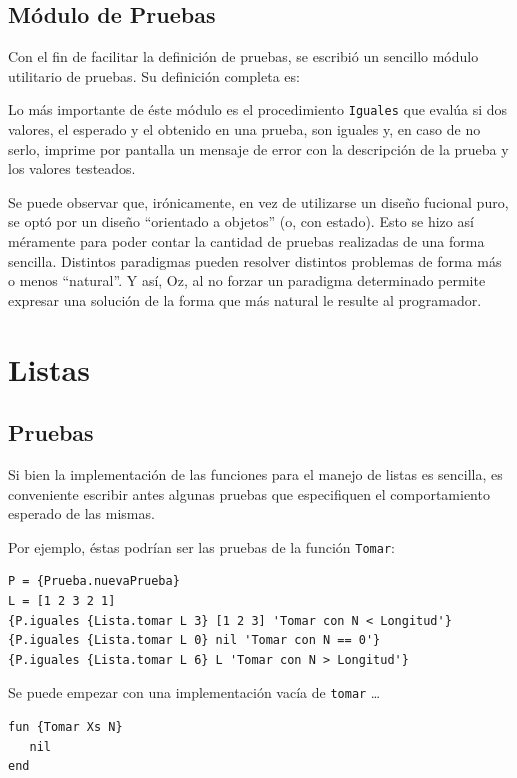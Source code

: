 \documentclass[12pt,titlepage]{article}
\begin{document}
\subsection{Módulo de Pruebas}

Con el fin de facilitar la definición de pruebas, se escribió un sencillo módulo utilitario de pruebas. Su definición completa es:


Lo más importante de éste módulo es el procedimiento \lstinline|Iguales| que evalúa si dos valores, el esperado y el obtenido en una prueba, son iguales y, en caso de no serlo, imprime por pantalla un mensaje de error con la descripción de la prueba y los valores testeados.

Se puede observar que, irónicamente, en vez de utilizarse un diseño fucional puro, se optó por un diseño ``orientado a objetos'' (o, con estado). Esto se hizo así méramente para poder contar la cantidad de pruebas realizadas de una forma sencilla. Distintos paradigmas pueden resolver distintos problemas de forma más o menos ``natural''. Y así, Oz, al no forzar un paradigma determinado permite expresar una solución de la forma que más natural le resulte al programador.

\section{Listas}

\subsection{Pruebas}

Si bien la implementación de las funciones para el manejo de listas es sencilla, es conveniente escribir antes algunas pruebas que especifiquen el comportamiento esperado de las mismas.

Por ejemplo, éstas podrían ser las pruebas de la función \lstinline|Tomar|:
\begin{lstlisting}
P = {Prueba.nuevaPrueba}
L = [1 2 3 2 1]
{P.iguales {Lista.tomar L 3} [1 2 3] 'Tomar con N < Longitud'}
{P.iguales {Lista.tomar L 0} nil 'Tomar con N == 0'}
{P.iguales {Lista.tomar L 6} L 'Tomar con N > Longitud'}
\end{lstlisting}

Se puede empezar con una implementación vacía de \lstinline|tomar| \dots
\begin{lstlisting}
fun {Tomar Xs N}
   nil
end
\end{lstlisting}
\end{document}
